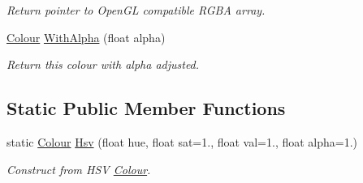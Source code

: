 \begin{DoxyCompactItemize}
\begin{DoxyCompactList}\small\item\em Return pointer to Open\+GL compatible R\+G\+BA array. \end{DoxyCompactList}\item 
\hyperlink{structpangolin_1_1_colour}{Colour} \hyperlink{structpangolin_1_1_colour_ae5405e31317ec5b65a205072f58a3b1a}{With\+Alpha} (float alpha)\hypertarget{structpangolin_1_1_colour_ae5405e31317ec5b65a205072f58a3b1a}{}\label{structpangolin_1_1_colour_ae5405e31317ec5b65a205072f58a3b1a}

\begin{DoxyCompactList}\small\item\em Return this colour with alpha adjusted. \end{DoxyCompactList}\end{DoxyCompactItemize}
\subsection*{Static Public Member Functions}
\begin{DoxyCompactItemize}
\item 
static \hyperlink{structpangolin_1_1_colour}{Colour} \hyperlink{structpangolin_1_1_colour_a52eef9b76740ae72099e5e2e4ca5f980}{Hsv} (float hue, float sat=1., float val=1., float alpha=1.)
\begin{DoxyCompactList}\small\item\em Construct from H\+SV \hyperlink{structpangolin_1_1_colour}{Colour}. \end{DoxyCompactList}\end{DoxyCompactItemize}
